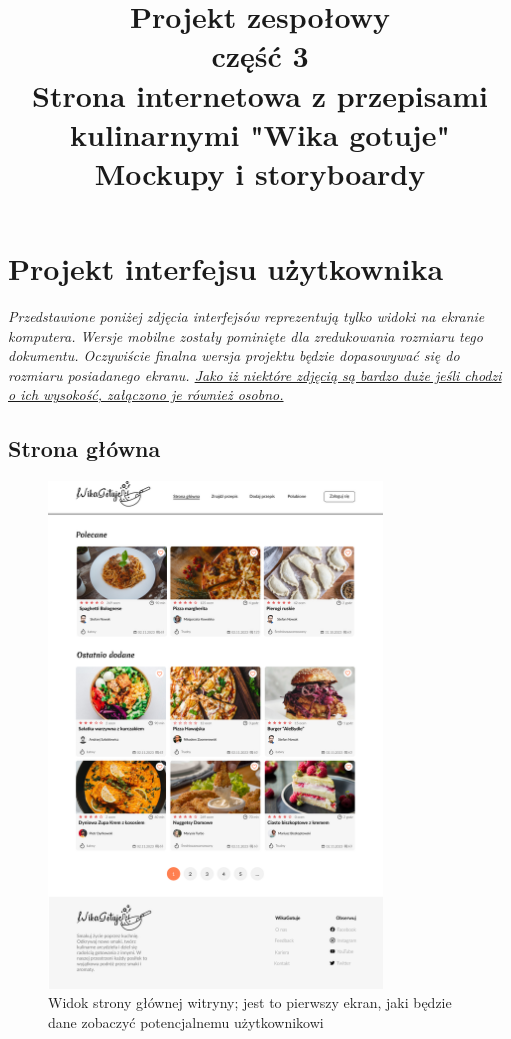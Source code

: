 \documentclass{article}
\title{\fontsize{20}{22}\selectfont Projekt zespołowy\\ część 3\\Strona internetowa z przepisami kulinarnymi "Wika gotuje"\\Mockupy i storyboardy}
\date{}
\begin{document}
\maketitle
\newpage

\section{Projekt interfejsu użytkownika}
\textit{Przedstawione poniżej zdjęcia interfejsów reprezentują tylko widoki na ekranie komputera. Wersje mobilne zostały pominięte dla zredukowania rozmiaru tego dokumentu. Oczywiście
finalna wersja projektu będzie dopasowywać się do rozmiaru posiadanego ekranu. \underline{Jako iż niektóre zdjęcią są bardzo duże jeśli chodzi o ich wysokość, załączono je
również osobno.}}

\subsection{Strona główna}
\begin{figure}[H]
    \begin{center}
        \includegraphics[width=0.79\textwidth]{mockups/main_page}
    \end{center}
    \caption{Widok strony głównej witryny; jest to pierwszy ekran, jaki będzie dane zobaczyć potencjalnemu użytkownikowi}
    \label{fig:main_page}
\end{figure}
    
\end{document}

